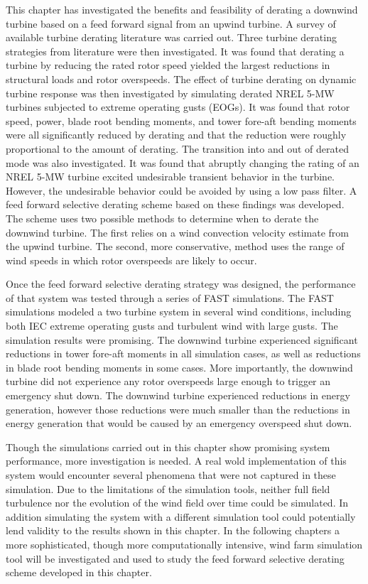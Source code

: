 This chapter has investigated the benefits and feasibility of derating a downwind turbine based on a feed forward signal from an upwind turbine. A survey of available turbine derating literature was carried out. Three turbine derating strategies from literature were then investigated. It was found that derating a turbine by reducing the rated rotor speed yielded the largest reductions in structural loads and rotor overspeeds. The effect of turbine derating on dynamic turbine response was then investigated by simulating derated NREL 5-MW turbines subjected to extreme operating gusts (EOGs). It was found that rotor speed, power, blade root bending moments, and tower fore-aft bending moments were all significantly reduced by derating and that the reduction were roughly proportional to the amount of derating. The transition into and out of derated mode was also investigated. It was found that abruptly changing the rating of an NREL 5-MW turbine excited undesirable transient behavior in the turbine. However, the undesirable behavior could be avoided by using a low pass filter. A feed forward selective derating scheme based on these findings was developed. The scheme uses two possible methods to determine when to derate the downwind turbine. The first relies on a wind convection velocity estimate from the upwind turbine. The second, more conservative, method uses the range of wind speeds in which rotor overspeeds are likely to occur. 

Once the feed forward selective derating strategy was designed, the performance of that system was tested through a series of FAST simulations. The FAST simulations modeled a two turbine system in several wind conditions, including both  IEC extreme operating gusts and turbulent wind with large gusts. The simulation results were promising. The downwind turbine experienced significant reductions in tower fore-aft moments in all simulation cases, as well as reductions in blade root bending moments in some cases. More importantly, the downwind turbine did not experience any rotor overspeeds large enough to trigger an emergency shut down. The downwind turbine experienced reductions in energy generation, however those reductions were much smaller than the reductions in energy generation that would be caused by an emergency overspeed shut down.

Though the simulations carried out in this chapter show promising system performance, more investigation is needed. A real wold implementation of this system would encounter several phenomena that were not captured in these simulation. Due to the limitations of the simulation tools, neither full field turbulence nor the evolution of the wind field over time could be simulated. In addition simulating the system with a different simulation tool could potentially lend validity to the results shown in this chapter. In the following chapters a more sophisticated, though more computationally intensive, wind farm simulation tool will be investigated and used to study the feed forward selective derating scheme developed in this chapter.

